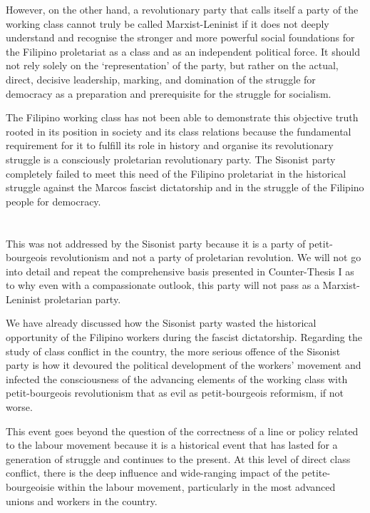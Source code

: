 However, on the other hand, 
a revolutionary party that calls itself 
a party of the working class 
cannot truly be called Marxist-Leninist 
if it does not deeply understand and recognise 
the stronger and more powerful social foundations 
for the Filipino proletariat 
as a class and as an independent political force. 
It should not rely solely on the `representation' of the party, 
but rather on the actual, direct, decisive leadership, marking, 
and domination of the struggle for democracy 
as a preparation and prerequisite 
for the struggle for socialism.

The Filipino working class has not been able to demonstrate 
this objective truth 
rooted in its position in society 
and its class relations 
because the fundamental requirement for it to fulfill its role in history 
and organise its revolutionary struggle 
is a consciously proletarian revolutionary party. 
The Sisonist party completely failed 
to meet this need of the Filipino proletariat 
in the historical struggle against the Marcos fascist dictatorship 
and in the struggle of the Filipino people for democracy.


\section{}
This was not addressed 
by the Sisonist party 
because it is a party of petit-bourgeois revolutionism 
and not a party of proletarian revolution. 
We will not go into detail 
and repeat the comprehensive basis 
presented in Counter-Thesis I
as to why even with a compassionate outlook, 
this party will not pass as a Marxist-Leninist proletarian party.

We have already discussed 
how the Sisonist party 
wasted the historical opportunity of the Filipino workers 
during the fascist dictatorship. 
Regarding the study of class conflict in the country, 
the more serious offence of the Sisonist party 
is how it devoured the political development of the workers' movement 
and infected the consciousness of the advancing elements of the working class 
with petit-bourgeois revolutionism
that as evil as petit-bourgeois reformism,
if not worse.

This event goes beyond the question of the correctness 
of a line or policy related to the labour movement 
because it is a historical event 
that has lasted for a generation of struggle 
and continues to the present. 
At this level of direct class conflict, 
there is the deep influence and wide-ranging impact 
of the petite-bourgeoisie within the labour movement, 
particularly in the most advanced unions and workers in the country.

